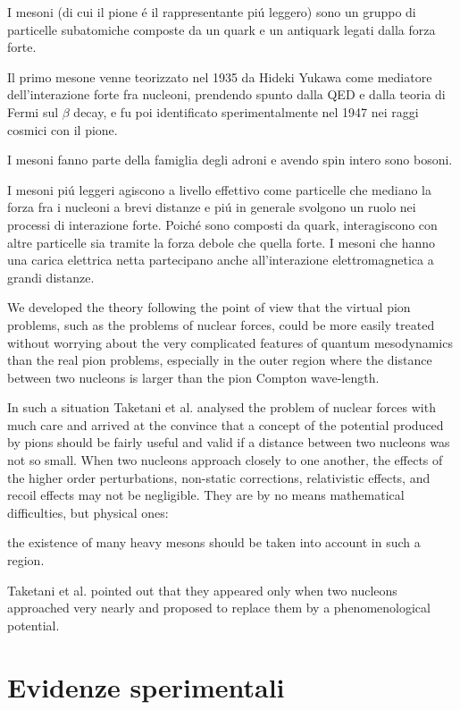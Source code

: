 \documentclass[main.tex]{subfiles}
\begin{document}
I mesoni (di cui il pione \'e il rappresentante pi\'u leggero) sono un gruppo di particelle subatomiche composte da un quark e un antiquark legati dalla forza forte.

Il primo mesone venne teorizzato nel 1935 da Hideki Yukawa come mediatore dell'interazione forte fra nucleoni, prendendo spunto dalla QED e dalla teoria di Fermi sul $\beta$ decay, e fu poi identificato sperimentalmente nel 1947 nei raggi cosmici con il pione.

I mesoni fanno parte della famiglia degli adroni e avendo spin intero sono bosoni.

I mesoni pi\'u leggeri agiscono a livello effettivo come particelle che mediano la forza fra i nucleoni a brevi distanze e pi\'u in generale svolgono un ruolo nei processi di interazione forte. Poich\'e sono composti da quark, interagiscono con altre particelle sia tramite la forza debole che quella forte. I mesoni che hanno una carica elettrica netta partecipano anche all'interazione elettromagnetica a grandi distanze.

We developed the theory following the point of view that the virtual pion problems, such as the problems of nuclear forces, could be more easily treated without worrying about the very complicated features of quantum mesodynamics than the real pion problems, especially in the outer region where the distance between two nucleons is larger than the pion Compton wave-length.

In such a situation Taketani et al. analysed the problem of nuclear forces with much care and arrived at the convince that a concept of the potential produced by pions should be fairly useful and valid if a distance between two nucleons was not so small. When two nucleons approach closely to one another, the effects of the higher order perturbations, non-static corrections, relativistic effects, and recoil effects may not be negligible. They are by no means mathematical difficulties, but physical ones:

the existence of many heavy mesons should be taken into account in such a region.

Taketani et al. pointed out that they appeared only when two nucleons approached very nearly and proposed to replace them by a phenomenological potential.

\section{Evidenze sperimentali}
\end{document}
